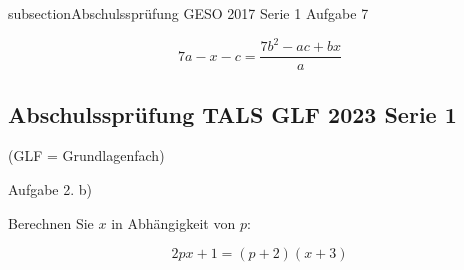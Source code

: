 subsection{Abschulssprüfung GESO 2017 Serie 1}
Aufgabe 7

$$7a -x -c = \frac{7b^2 -ac +bx}{a}$$


\subsection{Abschulssprüfung TALS GLF 2023 Serie 1}
(GLF = Grundlagenfach)

Aufgabe 2. b)

Berechnen Sie $x$ in Abhängigkeit von $p$:

$$2px + 1 = (p+2)(x+3)$$



